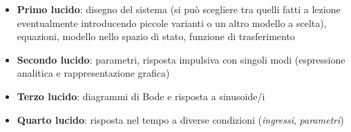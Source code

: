 \documentclass[
]{article}
\begin{document}
\begin{itemize}
\item
  \textbf{Primo lucido}: disegno del sistema (si può scegliere tra
  quelli fatti a lezione eventualmente introducendo piccole varianti o
  un altro modello a scelta), equazioni, modello nello spazio di stato,
  funzione di trasferimento
\item
  \textbf{Secondo lucido}: parametri, risposta impulsiva con singoli
  modi (espressione analitica e rappresentazione grafica)
\item
  \textbf{Terzo lucido}: diagrammi di Bode e risposta a sinusoide/i
\item
  \textbf{Quarto lucido}: risposta nel tempo a diverse condizioni
  (\emph{ingressi}, \emph{parametri})
\end{itemize}
\end{document}
